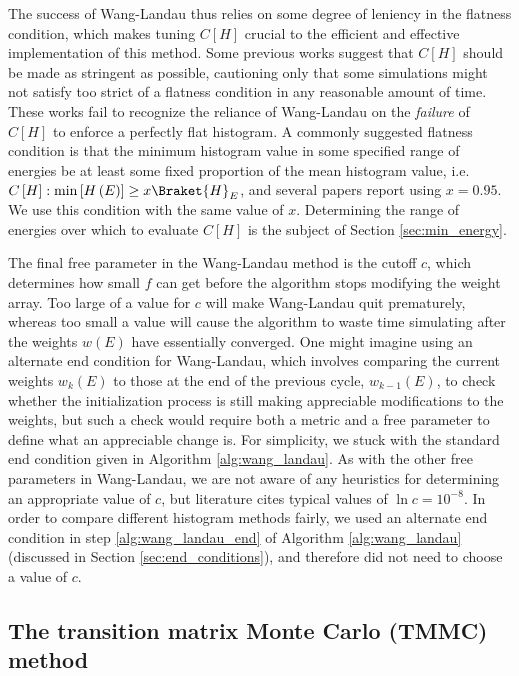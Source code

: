 \documentclass[11pt]{article}
\newcommand{\bk}{\Braket} %
\newcommand{\p}[1]{\left(#1\right)} %
\renewcommand{\sp}[1]{\left[#1\right]} %
\begin{document}
The success of Wang-Landau thus relies on some degree of leniency in
the flatness condition, which makes tuning $C\sp{H}$ crucial to the
efficient and effective implementation of this method. Some previous
works\cite{wang_landau} suggest that $C\sp{H}$ should be made as
stringent as possible, cautioning only that some simulations might not
satisfy too strict of a flatness condition in any reasonable amount of
time. These works fail to recognize the reliance of Wang-Landau on the
{\it failure} of $C\sp{H}$ to enforce a perfectly flat histogram. A
commonly suggested flatness condition is that the minimum histogram
value in some specified range of energies be at least some fixed
proportion of the mean histogram value, i.e.
$C\sp{H}:\min\sp{H\p{E}}\ge x\bk{H}_E$, and several papers report
using $x=0.95$. We use this condition with the same value of
$x$. Determining the range of energies over which to evaluate
$C\sp{H}$ is the subject of Section \ref{sec:min_energy}.

The final free parameter in the Wang-Landau method is the cutoff $c$,
which determines how small $f$ can get before the algorithm stops
modifying the weight array. Too large of a value for $c$ will make
Wang-Landau quit prematurely, whereas too small a value will cause the
algorithm to waste time simulating after the weights $w\p{E}$ have
essentially converged. One might imagine using an alternate end
condition for Wang-Landau, which involves comparing the current
weights $w_k\p{E}$ to those at the end of the previous cycle,
$w_{k-1}\p{E}$, to check whether the initialization process is still
making appreciable modifications to the weights, but such a check
would require both a metric and a free parameter to define what an
appreciable change is. For simplicity, we stuck with the standard end
condition given in Algorithm \ref{alg:wang_landau}. As with the other
free parameters in Wang-Landau, we are not aware of any heuristics for
determining an appropriate value of $c$, but literature cites typical
values of $\ln c=10^{-8}$. In order to compare different histogram
methods fairly, we used an alternate end condition in step
\ref{alg:wang_landau_end} of Algorithm \ref{alg:wang_landau}
(discussed in Section \ref{sec:end_conditions}), and therefore did not
need to choose a value of $c$.

\subsection{The transition matrix Monte Carlo (TMMC) method}
\label{sec:tmmc}
\end{document}
